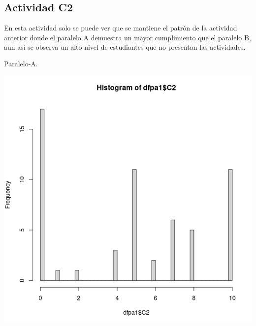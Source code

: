 \documentclass[a4pa<per,12pt,spanish]{article}
\begin{document}
\subsection{Actividad C2}
\label{sec:actividad-c2}
En esta actividad solo se puede ver que se mantiene el patrón de la actividad anterior donde el paralelo A demuestra un mayor cumplimiento que el paralelo B, aun así se observa un alto nivel de estudiantes que no presentan las actividades.\\



\begin{minipage}[h]{0.45\linewidth}
Paralelo-A.

\includegraphics[scale=0.3]{images/histoC2.png}
\end{minipage}
\end{document}
